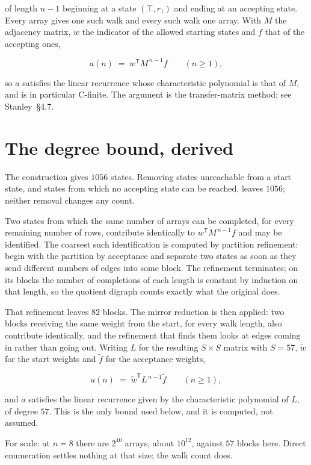 \documentclass[11pt]{article}
\theoremstyle{definition}
\begin{document}
of length $n-1$ beginning at a state $(\top,r_1)$ and ending at an accepting state. Every array gives one such walk and every such walk one array. With $M$ the adjacency matrix, $w$ the indicator of the allowed starting states and $f$ that of the accepting ones,

\[a(n) \;=\; w^{\mathsf T} M^{\,n-1} f \qquad (n \ge 1),\]

so $a$ satisfies the linear recurrence whose characteristic polynomial is that of $M$, and is in particular C-finite. The argument is the transfer-matrix method; see Stanley~\S4.7.

\section{The degree bound, derived}

The construction gives $1056$ states. Removing states unreachable from a start state, and states from which no accepting state can be reached, leaves $1056$; neither removal changes any count.

Two states from which the same number of arrays can be completed, for every remaining number of rows, contribute identically to $w^{\mathsf T}M^{\,n-1}f$ and may be identified. The coarsest such identification is computed by partition refinement: begin with the partition by acceptance and separate two states as soon as they send different numbers of edges into some block. The refinement terminates; on its blocks the number of completions of each length is constant by induction on that length, so the quotient digraph counts exactly what the original does.

That refinement leaves $82$ blocks. The mirror reduction is then applied: two blocks receiving the same weight from the start, for every walk length, also contribute identically, and the refinement that finds them looks at edges coming in rather than going out. Writing $L$ for the resulting $S \times S$ matrix with $S = 57$, $\tilde w$ for the start weights and $\tilde f$ for the acceptance weights,

\[a(n) \;=\; \tilde w^{\mathsf T} L^{\,n-1} \tilde f \qquad (n \ge 1),\]

and $a$ satisfies the linear recurrence given by the characteristic polynomial of $L$, of degree $57$. This is the only bound used below, and it is computed, not assumed.

For scale: at $n = 8$ there are $2^{40}$ arrays, about $10^{12}$, against $57$ blocks here. Direct enumeration settles nothing at that size; the walk count does.
\end{document}
